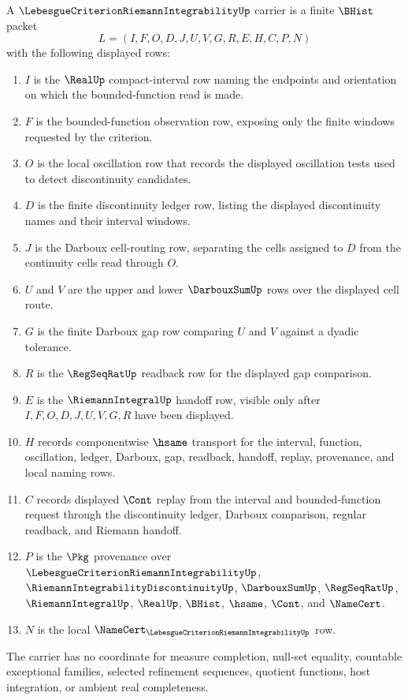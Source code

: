 \begin{definition}
\label{def:lebesgue-criterion-riemann-integrability-carrier}
A $\LebesgueCriterionRiemannIntegrabilityUp$ carrier is a finite $\BHist$ packet
$$
L=(I,F,O,D,J,U,V,G,R,E,H,C,P,N)
$$
with the following displayed rows:
\begin{enumerate}
\item $I$ is the $\RealUp$ compact-interval row naming the endpoints and orientation on which the bounded-function read is made.
\item $F$ is the bounded-function observation row, exposing only the finite windows requested by the criterion.
\item $O$ is the local oscillation row that records the displayed oscillation tests used to detect discontinuity candidates.
\item $D$ is the finite discontinuity ledger row, listing the displayed discontinuity names and their interval windows.
\item $J$ is the Darboux cell-routing row, separating the cells assigned to $D$ from the continuity cells read through $O$.
\item $U$ and $V$ are the upper and lower $\DarbouxSumUp$ rows over the displayed cell route.
\item $G$ is the finite Darboux gap row comparing $U$ and $V$ against a dyadic tolerance.
\item $R$ is the $\RegSeqRatUp$ readback row for the displayed gap comparison.
\item $E$ is the $\RiemannIntegralUp$ handoff row, visible only after $I,F,O,D,J,U,V,G,R$ have been displayed.
\item $H$ records componentwise $\hsame$ transport for the interval, function, oscillation, ledger, Darboux, gap, readback, handoff, replay, provenance, and local naming rows.
\item $C$ records displayed $\Cont$ replay from the interval and bounded-function request through the discontinuity ledger, Darboux comparison, regular readback, and Riemann handoff.
\item $P$ is the $\Pkg$ provenance over $\LebesgueCriterionRiemannIntegrabilityUp$, $\RiemannIntegrabilityDiscontinuityUp$, $\DarbouxSumUp$, $\RegSeqRatUp$, $\RiemannIntegralUp$, $\RealUp$, $\BHist$, $\hsame$, $\Cont$, and $\NameCert$.
\item $N$ is the local $\NameCert_{\LebesgueCriterionRiemannIntegrabilityUp}$ row.
\end{enumerate}
The carrier has no coordinate for measure completion, null-set equality, countable exceptional families, selected refinement sequences, quotient functions, host integration, or ambient real completeness.
\end{definition}

